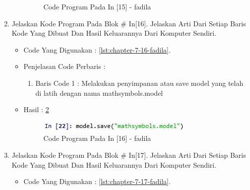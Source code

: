 \begin{enumerate}
\begin{itemize}
\begin{figure}[!hbtp]
\caption{Code Program Pada In [15] - fadila}
\label{chapter-7-in-15-fadila}
\end{figure}
\par
\par
\end{itemize}
\par
\par
\par
\item Jelaskan Kode Program Pada Blok \# In[16]. Jelaskan Arti Dari Setiap Baris Kode Yang Dibuat Dan Hasil Keluarannya Dari Komputer Sendiri.
\begin{itemize}
\item Code Yang Digunakan : \ref{lst:chapter-7-16-fadila}.

\par
\par
\item Penjelasan Code Perbaris	: 
\begin{enumerate}
\item Baris Code 1	: Melakukan penyimpanan atau save model yang telah di latih dengan nama mathsymbols.model 
\end{enumerate}
\par
\par
\item Hasil : \ref{chapter-7-in-16-fadila}
\par
\par
\begin{figure}[!hbtp]
\centering
\includegraphics[scale=0.4]{figures/chapter-7-in-16-fadila.jpg}
\caption{Code Program Pada In [16] - fadila}
\label{chapter-7-in-16-fadila}
\end{figure}
\par
\par
\end{itemize}
\par
\par
\par
\item Jelaskan Kode Program Pada Blok \# In[17]. Jelaskan Arti Dari Setiap Baris Kode Yang Dibuat Dan Hasil Keluarannya Dari Komputer Sendiri.
\begin{itemize}
\item Code Yang Digunakan : \ref{lst:chapter-7-17-fadila}.

\end{itemize}
\end{enumerate}
